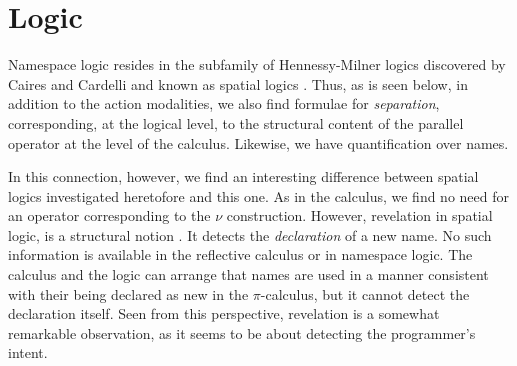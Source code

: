\documentclass[]{amsart}
\makeatletter
\newcommand{\nameeq}{\mathbin{\equiv_N}}
\newcommand{\lift}[2]{#1 ! ( #2 )}
\newcommand{\quotep}[1]{@#1}
\newcommand{\parop}{\;|\;}		%
\newcommand{\wbbisim}{\stackrel{\centerdot}{\approx}} %
\newcommand{\fwbeq}{\stackrel{\circ}{\approx}}	%
\newcommand{\wbeq}{\approx}	%
\newtheorem{lem}[thm]{Lemma}
\theoremstyle{definition}
\newtheorem{defn}[thm]{Definition}
\theoremstyle{remark}
\newtheorem{rem}[thm]{Remark}
\numberwithin{equation}{subsection}
\newcommand{\pic}{$\pi$-calculus}
\makeatother
\begin{document}





\section{Logic}
Namespace logic resides in the subfamily of Hennessy-Milner logics
discovered by Caires and Cardelli and known as spatial logics
\cite{DBLP:journals/tcs/CairesC04}. Thus, as is seen below, in
addition to the action modalities, we also find formulae for
\emph{separation}, corresponding, at the logical level, to the
structural content of the parallel operator at the level of the
calculus. Likewise, we have quantification over names. 

In this connection, however, we find an interesting difference between
spatial logics investigated heretofore and this one. As in the
calculus, we find no need for an operator corresponding to the $\nu$
construction. However, revelation in spatial logic, is a structural
notion \cite{DBLP:journals/tcs/CairesC04}. It detects the
\emph{declaration} of a new name. No such information is available in
the reflective calculus or in namespace logic. The calculus and the
logic can arrange that names are used in a manner consistent with
their being declared as new in the {\pic}, but it cannot detect the
declaration itself. Seen from this perspective, revelation is a
somewhat remarkable observation, as it seems to be about detecting the
programmer's intent.
\end{document}
